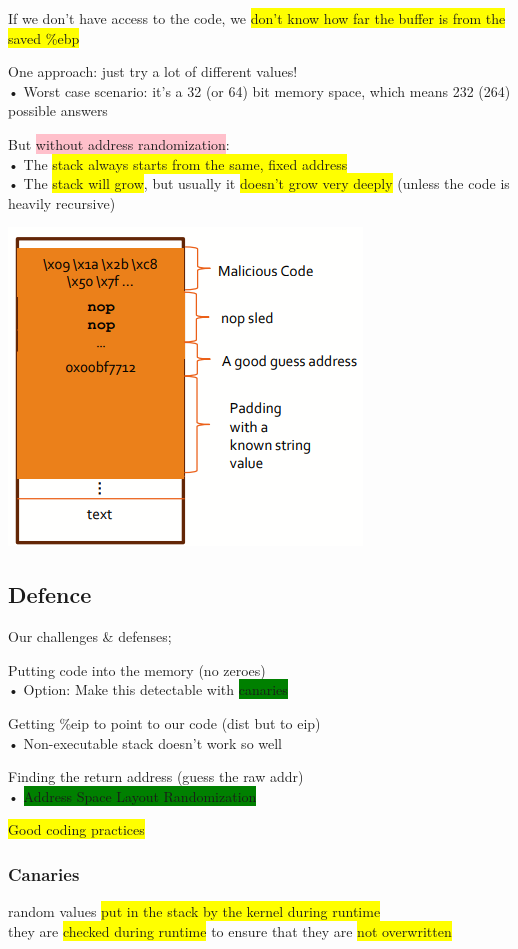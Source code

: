 \documentclass[]{project_plan}
\begin{document}
If we don’t have access to the code, we \colorbox{yellow}{don’t know how far the buffer is from the
  saved \%ebp}

One approach: just try a lot of different values!\\
• Worst case scenario: it’s a 32 (or 64) bit memory space, which means 232 (264)
possible answers

But \colorbox{pink}{without address randomization}:\\
• The \colorbox{yellow}{stack always starts from the same, fixed address}\\
• The \colorbox{yellow}{stack will grow}, but usually it \colorbox{yellow}{doesn’t grow very deeply} (unless the code is heavily recursive)

\includegraphics[width=.4\linewidth]{lec6 challenge3}



\subsection{Defence}

Our challenges \& defenses;

Putting code into the memory (no zeroes)\\
• Option: Make this detectable with \colorbox{green}{canaries}

Getting \%eip to point to our code (dist but to eip)\\
• Non-executable stack doesn’t work so well

Finding the return address (guess the raw addr)\\
• \colorbox{green}{Address Space Layout Randomization}

\colorbox{yellow}{Good coding practices}

\subsubsection{Canaries}

random values \colorbox{yellow}{put in the stack by the kernel during runtime}\\
they are \colorbox{yellow}{checked during runtime} to ensure that they are \colorbox{yellow}{not overwritten}
\end{document}
